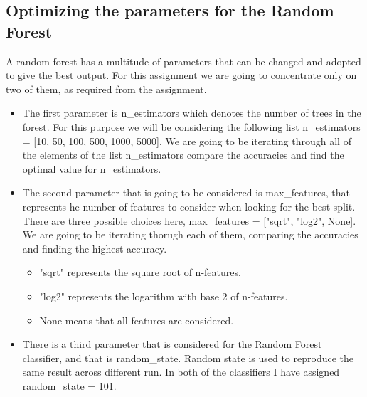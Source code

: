 \documentclass{article}
\begin{document}
\subsection{Optimizing the parameters for the Random Forest}
A random forest has a multitude of parameters that can be changed and adopted to give the best output. For this assignment we are going to concentrate only on two of them, as required from the assignment. 
\begin{itemize}
    \item The first parameter is n\_estimators which denotes the number of trees in the forest. For this purpose we will be considering the following list n\_estimators = [10, 50, 100, 500, 1000, 5000]. We are going to be iterating through all of the elements of the list n\_estimators compare the accuracies and find the optimal value for n\_estimators. 
    \item The second parameter that is going to be considered is max\_features, that represents he number of features to consider when looking for the best split. There are three possible choices here, max\_features = ["sqrt", "log2", None]. We are going to be iterating thorugh each of them, comparing the accuracies and finding the highest accuracy. 
    \begin{itemize}
        \item "sqrt" represents the square root of n-features.
        \item "log2" represents the logarithm with base 2 of n-features. 
        \item None means that all features are considered.
    \end{itemize}
    \item There is a third parameter that is considered for the Random Forest classifier, and that is random\_state. Random state is used to reproduce the same result across different run. In both of the classifiers I have assigned random\_state = 101.
\end{itemize}
\end{document}
